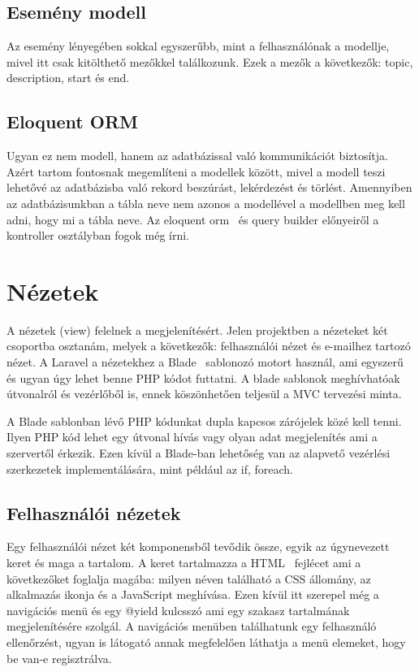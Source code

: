 \documentclass[
]{thesis-ekf}
\theoremstyle{definition}
\theoremstyle{remark}
\begin{document}
\subsection{Esemény modell}
Az esemény lényegében sokkal egyszerűbb, mint a felhasználónak a modellje, mivel itt csak kitölthető mezőkkel találkozunk. Ezek a mezők a következők: topic, description, start és end.

\subsection{Eloquent ORM}
Ugyan ez nem modell, hanem az adatbázissal való kommunikációt biztosítja. Azért tartom fontosnak megemlíteni a modellek között, mivel a modell teszi lehetővé az adatbázisba való rekord beszúrást, lekérdezést és törlést. Amennyiben az adatbázisunkban a tábla neve nem azonos a modellével a modellben meg kell adni, hogy mi a tábla neve. Az eloquent orm~\cite{laravel_eloquent} és query builder előnyeiről a kontroller osztályban fogok még írni.

\section{Nézetek}
A nézetek (view) felelnek a megjelenítésért. Jelen projektben a nézeteket két csoportba osztanám, melyek a következők: felhasználói nézet és e-mailhez tartozó nézet. A Laravel a nézetekhez a Blade~\cite{laravel_blade} sablonozó motort használ, ami egyszerű és ugyan úgy lehet benne PHP kódot futtatni. A blade sablonok meghívhatóak útvonalról és vezérlőből is, ennek köszönhetően teljesül a MVC tervezési minta. 

A Blade sablonban lévő PHP kódunkat dupla kapcsos zárójelek közé kell tenni. Ilyen PHP kód lehet egy útvonal hívás vagy olyan adat megjelenítés ami a szervertől érkezik. Ezen kívül a Blade-ban lehetőség van az alapvető vezérlési szerkezetek implementálására, mint például az if, foreach.

\subsection{Felhasználói nézetek}

Egy felhasználói nézet két komponensből tevődik össze, egyik az úgynevezett keret és maga a tartalom. A keret tartalmazza a HTML~\cite{html_doc} fejlécet ami a következőket foglalja magába: milyen néven található a CSS állomány, az alkalmazás ikonja és a JavaScript meghívása. Ezen kívül itt szerepel még a navigációs menü és egy @yield kulcsszó ami egy szakasz tartalmának megjelenítésére szolgál. A navigációs menüben találhatunk egy felhasználó ellenőrzést, ugyan is látogató annak megfelelően láthatja a menü elemeket, hogy be van-e regisztrálva.
\end{document}
